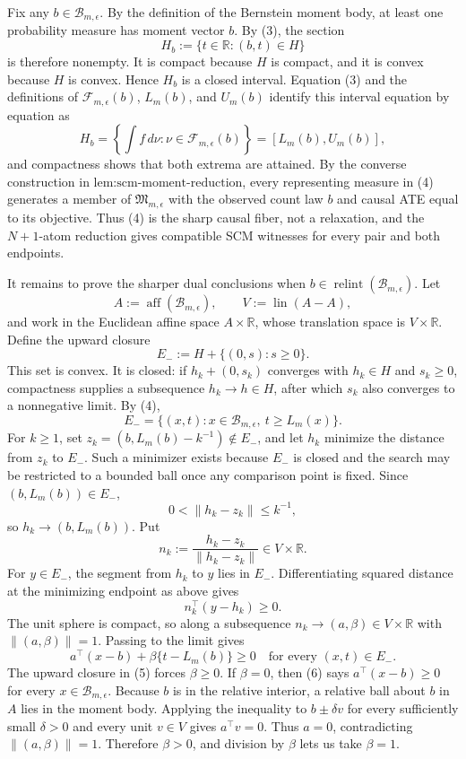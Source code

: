 Fix any \(b\in\mathcal B_{m,\epsilon}\). By the definition of the Bernstein moment body, at least one probability measure has moment vector \(b\). By (3), the section
\[
 H_b:=\{t\in\mathbb R:(b,t)\in H\}
\]
is therefore nonempty. It is compact because \(H\) is compact, and it is convex because \(H\) is convex. Hence \(H_b\) is a closed interval. Equation (3) and the definitions of \(\mathcal F_{m,\epsilon}(b)\), \(L_m(b)\), and \(U_m(b)\) identify this interval equation by equation as
\[
 H_b
 =\left\{\int f\,d\nu:\nu\in\mathcal F_{m,\epsilon}(b)\right\}
 =[L_m(b),U_m(b)],
\tag{4}
\]
and compactness shows that both extrema are attained. By the converse construction in \(\text{lem:scm-moment-reduction}\), every representing measure in (4) generates a member of \(\mathfrak M_{m,\epsilon}\) with the observed count law \(b\) and causal ATE equal to its objective. Thus (4) is the sharp causal fiber, not a relaxation, and the \(N+1\)-atom reduction gives compatible SCM witnesses for every pair and both endpoints.

It remains to prove the sharper dual conclusions when
\(b\in\operatorname{relint}(\mathcal B_{m,\epsilon})\). Let
\[
 A:=\operatorname{aff}(\mathcal B_{m,\epsilon}),
 \qquad V:=\operatorname{lin}(A-A),
\]
and work in the Euclidean affine space \(A\times\mathbb R\), whose translation space is \(V\times\mathbb R\). Define the upward closure
\[
 E_-:=H+\{(0,s):s\geq0\}.
\]
This set is convex. It is closed: if \(h_k+(0,s_k)\) converges with \(h_k\in H\) and \(s_k\geq0\), compactness supplies a subsequence \(h_k\to h\in H\), after which \(s_k\) also converges to a nonnegative limit. By (4),
\[
 E_- =\{(x,t):x\in\mathcal B_{m,\epsilon},\ t\geq L_m(x)\}.
\tag{5}
\]
For \(k\geq1\), set \(z_k=(b,L_m(b)-k^{-1})\notin E_-\), and let \(h_k\) minimize the distance from \(z_k\) to \(E_-\). Such a minimizer exists because \(E_-\) is closed and the search may be restricted to a bounded ball once any comparison point is fixed. Since \((b,L_m(b))\in E_-\),
\[
 0<\lVert h_k-z_k\rVert\leq k^{-1},
\]
so \(h_k\to(b,L_m(b))\). Put
\[
 n_k:=\frac{h_k-z_k}{\lVert h_k-z_k\rVert}\in V\times\mathbb R.
\]
For \(y\in E_-\), the segment from \(h_k\) to \(y\) lies in \(E_-\). Differentiating squared distance at the minimizing endpoint as above gives
\[
 n_k^{\top}(y-h_k)\geq0.
\]
The unit sphere is compact, so along a subsequence \(n_k\to(a,\beta)\in V\times\mathbb R\) with \(\lVert(a,\beta)\rVert=1\). Passing to the limit gives
\[
 a^{\top}(x-b)+\beta\{t-L_m(b)\}\geq0
 \quad\text{for every }(x,t)\in E_-.
\tag{6}
\]
The upward closure in (5) forces \(\beta\geq0\). If \(\beta=0\), then (6) says \(a^{\top}(x-b)\geq0\) for every \(x\in\mathcal B_{m,\epsilon}\). Because \(b\) is in the relative interior, a relative ball about \(b\) in \(A\) lies in the moment body. Applying the inequality to \(b\pm\delta v\) for every sufficiently small \(\delta>0\) and every unit \(v\in V\) gives \(a^{\top}v=0\). Thus \(a=0\), contradicting \(\lVert(a,\beta)\rVert=1\). Therefore \(\beta>0\), and division by \(\beta\) lets us take \(\beta=1\).

